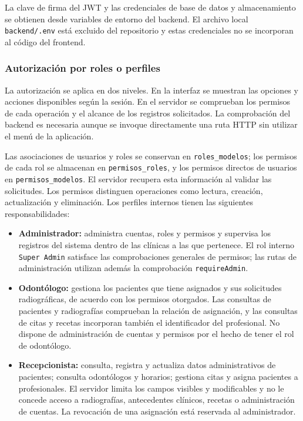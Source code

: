 La clave de firma del JWT y las credenciales de base de datos y almacenamiento
se obtienen desde variables de entorno del backend. El archivo local
\texttt{backend/.env} está excluido del repositorio y estas credenciales
no se incorporan al código del frontend.

\subsubsection{Autorización por roles o perfiles}

La autorización se aplica en dos niveles. En la interfaz se muestran las
opciones y acciones disponibles según la sesión. En el servidor se
comprueban los permisos de cada operación y el alcance de los registros
solicitados. La comprobación del backend es necesaria aunque se invoque
directamente una ruta HTTP sin utilizar el menú de la aplicación.

Las asociaciones de usuarios y roles se conservan en
\texttt{roles\_modelos}; los permisos de cada rol se almacenan en
\texttt{permisos\_roles}, y los permisos directos de usuarios en
\texttt{permisos\_modelos}. El servidor recupera esta información al
validar las solicitudes. Los permisos distinguen operaciones como lectura,
creación, actualización y eliminación. Los perfiles internos tienen las
siguientes responsabilidades:

\begin{itemize}
  \item \textbf{Administrador:} administra cuentas, roles y permisos y
  supervisa los registros del sistema dentro de las clínicas a las que
  pertenece. El rol interno \texttt{Super Admin} satisface las comprobaciones
  generales de permisos; las rutas de administración utilizan además la
  comprobación \texttt{requireAdmin}.

  \item \textbf{Odontólogo:} gestiona los pacientes que tiene asignados
  y sus solicitudes radiográficas, de acuerdo con los permisos otorgados.
  Las consultas de pacientes y radiografías comprueban la relación de
  asignación, y las consultas de citas y recetas incorporan también el
  identificador del profesional. No dispone de administración de cuentas
  y permisos por el hecho de tener el rol de odontólogo.

  \item \textbf{Recepcionista:} consulta, registra y actualiza datos
  administrativos de pacientes; consulta odontólogos y horarios; gestiona
  citas y asigna pacientes a profesionales. El servidor limita los campos
  visibles y modificables y no le concede acceso a radiografías,
  antecedentes clínicos, recetas o administración de cuentas. La
  revocación de una asignación está reservada al administrador.
\end{itemize}

